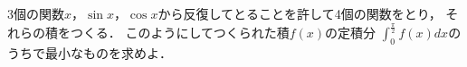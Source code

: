 \documentclass[../../main.tex]{subfiles}
\begin{document}
3個の関数$x$，$\sin x$，$\cos x$から反復してとることを許して4個の関数をとり，
それらの積をつくる．
このようにしてつくられた積$f(x)$の定積分
$\displaystyle\int_0^{\frac{\pi}{2}}f(x)dx$のうちで最小なものを求めよ．
\end{document}
